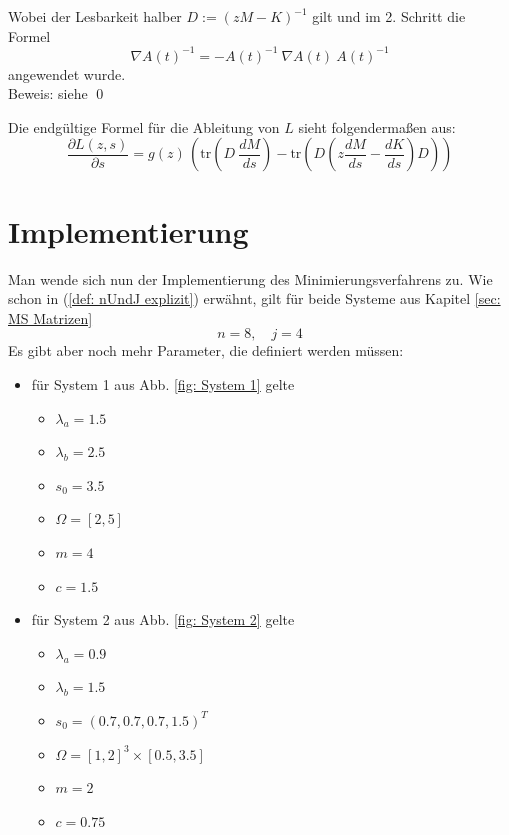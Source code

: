 \documentclass[a4paper,12pt]{report}
\newcommand{\klammer}[1]{\left(#1\right)}
\newcommand{\tr}{\text{tr}}
\newcommand{\inv}{^{-1}}
\newcommand{\1}{\mathds{1}}
\theoremstyle{plain} %
\theoremstyle{definition} %
\theoremstyle{remark}
\begin{document}
            Wobei der Lesbarkeit halber $D:=(zM-K)\inv$ gilt und im 2. Schritt die Formel
            $$\nabla A(t)\inv = -A(t)\inv\ \nabla A(t)\ A(t)\inv$$
            angewendet wurde.\\
            Beweis: siehe \cite{derivativeInverseMatrix}\qed

            Die endgültige Formel für die Ableitung von $L$ sieht folgendermaßen aus:
            \begin{equation}
                  \label{eqn: vollständigeAblL}
                  \frac{\partial L(z,s)}{\partial s} = g(z)\,\klammer{\tr\klammer{D \ \frac{dM}{ds}} - \tr\klammer{D \klammer{z \frac{dM}{ds}-\frac{dK}{ds}} D}}
            \end{equation}
            
\chapter{Implementierung}
\label{sec: Programmieren}

      Man wende sich nun der Implementierung des Minimierungsverfahrens zu.
      Wie schon in (\ref{def: nUndJ explizit}) erwähnt, gilt für beide Systeme aus Kapitel \ref{sec: MS Matrizen}
      $$n=8,\quad j=4$$
      Es gibt aber noch mehr Parameter, die definiert werden müssen:
      \begin{itemize}
            \item für System 1 aus Abb. \ref{fig: System 1} gelte
            \begin{itemize}
                  \item $\lambda_a = 1.5$
                  \item $\lambda_b = 2.5$
                  \item $s_0 = 3.5$
                  \item $\Omega = [2,5]$
                  \item $m = 4$
                  \item $c = 1.5$
            \end{itemize}
            \item für System 2 aus Abb. \ref{fig: System 2} gelte
            \begin{itemize}
                  \item $\lambda_a = 0.9$
                  \item $\lambda_b = 1.5$
                  \item $s_0 = (0.7, 0.7, 0.7, 1.5)^T$
                  \item $\Omega = [1,2]^3\times [0.5,3.5]$
                  \item $m = 2$
                  \item $c = 0.75$
            \end{itemize}
      \end{itemize}
\end{document}
